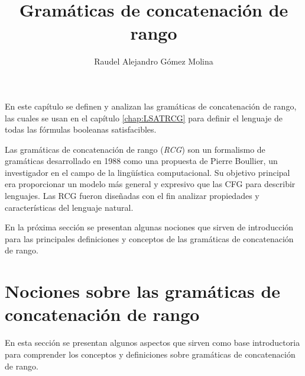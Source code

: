 \documentclass[12pt]{article}
\title{Gramáticas de concatenación de rango}
\author{Raudel Alejandro Gómez Molina}
\begin{document}
\maketitle






En este capítulo se definen y analizan las gramáticas de concatenación de rango, las cuales se usan en el
capítulo \ref{chap:LSATRCG} para definir el lenguaje de todas las fórmulas booleanas satisfacibles.

Las gramáticas de concatenación de rango (\textit{RCG}) \cite{mainRCGBib} son un formalismo de gramáticas desarrollado
en 1988 como una propuesta de Pierre Boullier, un investigador en el campo de la lingüística computacional. Su
objetivo principal era proporcionar un modelo más general y expresivo que las CFG para describir lenguajes.
Las RCG fueron diseñadas con el fin analizar propiedades y características del lenguaje natural.

En la próxima sección se presentan algunas nociones que sirven de introducción para las principales definiciones y conceptos
de las gramáticas de concatenación de rango.

\section{Nociones sobre las gramáticas de concatenación de rango}

En esta sección se presentan algunos aspectos que sirven como base introductoria para comprender los conceptos y definiciones
sobre gramáticas de concatenación de rango.
\end{document}
